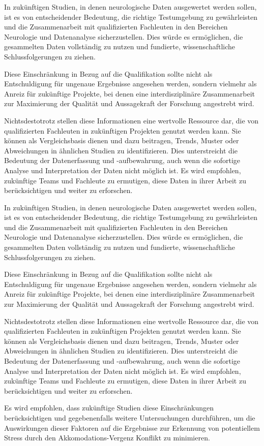 \documentclass[conference]{IEEEtran}
\begin{document}
\begin{myitemize}
    In zukünftigen Studien, in denen neurologische Daten ausgewertet werden sollen, ist es von entscheidender Bedeutung, die richtige Testumgebung zu gewährleisten und die Zusammenarbeit mit qualifizierten Fachleuten in den Bereichen Neurologie und Datenanalyse sicherzustellen. Dies würde es ermöglichen, die gesammelten Daten vollständig zu nutzen und fundierte, wissenschaftliche Schlussfolgerungen zu ziehen. 
    
    Diese Einschränkung in Bezug auf die Qualifikation sollte nicht als Entschuldigung für ungenaue Ergebnisse angesehen werden, sondern vielmehr als Anreiz für zukünftige Projekte, bei denen eine interdisziplinäre Zusammenarbeit zur Maximierung der Qualität und Aussagekraft der Forschung angestrebt wird.

    Nichtsdestotrotz stellen diese Informationen eine wertvolle Ressource dar, die von qualifizierten Fachleuten in zukünftigen Projekten genutzt werden kann. Sie können als Vergleichsbasis dienen und dazu beitragen, Trends, Muster oder Abweichungen in ähnlichen Studien zu identifizieren. Dies unterstreicht die Bedeutung der Datenerfassung und -aufbewahrung, auch wenn die sofortige Analyse und Interpretation der Daten nicht möglich ist. Es wird empfohlen, zukünftige Teams und Fachleute zu ermutigen, diese Daten in ihrer Arbeit zu berücksichtigen und weiter zu erforschen.

    In zukünftigen Studien, in denen neurologische Daten ausgewertet werden sollen, ist es von entscheidender Bedeutung, die richtige Testumgebung zu gewährleisten und die Zusammenarbeit mit qualifizierten Fachleuten in den Bereichen Neurologie und Datenanalyse sicherzustellen. Dies würde es ermöglichen, die gesammelten Daten vollständig zu nutzen und fundierte, wissenschaftliche Schlussfolgerungen zu ziehen.

    Diese Einschränkung in Bezug auf die Qualifikation sollte nicht als Entschuldigung für ungenaue Ergebnisse angesehen werden, sondern vielmehr als Anreiz für zukünftige Projekte, bei denen eine interdisziplinäre Zusammenarbeit zur Maximierung der Qualität und Aussagekraft der Forschung angestrebt wird.

    Nichtsdestotrotz stellen diese Informationen eine wertvolle Ressource dar, die von qualifizierten Fachleuten in zukünftigen Projekten genutzt werden kann. Sie können als Vergleichsbasis dienen und dazu beitragen, Trends, Muster oder Abweichungen in ähnlichen Studien zu identifizieren. Dies unterstreicht die Bedeutung der Datenerfassung und -aufbewahrung, auch wenn die sofortige Analyse und Interpretation der Daten nicht möglich ist. Es wird empfohlen, zukünftige Teams und Fachleute zu ermutigen, diese Daten in ihrer Arbeit zu berücksichtigen und weiter zu erforschen.

    Es wird empfohlen, dass zukünftige Studien diese Einschränkungen berücksichtigen und gegebenenfalls weitere Untersuchungen durchführen, um die Auswirkungen dieser Faktoren auf die Ergebnisse zur Erkennung von potentiellem Stress durch den Akkomodations-Vergenz Konflikt zu minimieren.
\end{myitemize}
\end{document}
